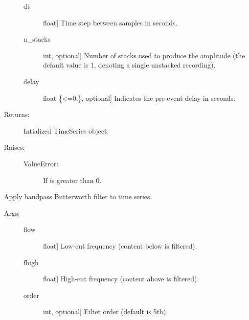 \documentclass[letterpaper,10pt,english,openany,oneside]{sphinxmanual}
\begin{document}
\begin{fulllineitems}
\begin{fulllineitems}
\begin{description}
\begin{description}
\item[{dt}] \leavevmode{[}float{]}
Time step between samples in seconds.

\item[{n\_stacks}] \leavevmode{[}int, optional{]}
Number of stacks used to produce the amplitude (the
default value is 1, denoting a single unstacked 
recording).

\item[{delay}] \leavevmode{[}float \{\textless{}=0.\}, optional{]}
Indicates the pre-event delay in seconds.

\end{description}

\item[{Returns:}] \leavevmode
Intialized TimeSeries object.

\item[{Raises:}] \leavevmode\begin{description}
\item[{ValueError:}] \leavevmode
If  is greater than 0.

\end{description}

\end{description}

\end{fulllineitems}


\begin{fulllineitems}
\label{\detokenize{index:sigpropy.TimeSeries.bandpassfilter}}
Apply bandpass Butterworth filter to time series.
\begin{description}
\item[{Args:}] \leavevmode\begin{description}
\item[{flow}] \leavevmode{[}float{]}
Low-cut frequency (content below  is filtered).

\item[{fhigh}] \leavevmode{[}float{]}
High-cut frequency (content above  is filtered).

\item[{order}] \leavevmode{[}int, optional{]}
Filter order (default is 5th).

\end{description}


\end{description}
\end{fulllineitems}
\end{fulllineitems}
\end{document}
